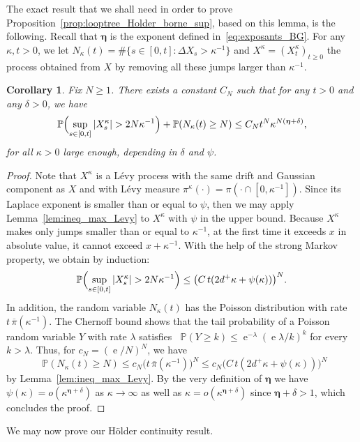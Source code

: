 \documentclass[british, a4paper,11pt]{article}
\numberwithin{equation}{section}
\newtheorem{cor}[thm]{Corollary}
\theoremstyle{definition}
\renewcommand{\P}{\mathop{}\!\mathbb{P}}
\newcommand{\e}{\operatorname{e}}
\newcommand{\bdeta}{\boldsymbol{\eta}}
\begin{document}
The exact result that we shall need in order to prove Proposition~\ref{prop:looptree_Holder_borne_sup}, based on this lemma, is the following.
Recall that $\bdeta$ is the exponent defined in~\eqref{eq:exposants_BG}.
For any $\kappa, t >0$, we let $N_\kappa(t) = \#\{s \in [0,t] \colon \Delta X_s > \kappa^{-1}\}$ and
$X^\kappa = (X^\kappa_t)_{t \ge 0}$ the process obtained from $X$ by removing all these jumps larger than $\kappa^{-1}$. 


\begin{cor}\label{cor:ineq_max_Levy_tronque}
Fix $N \ge 1$. There exists a constant $C_N$ such that for any $t > 0$ and any $\delta>0$, we have
\[\P\Bigl(\sup_{s \in [0,t]} |X^\kappa_{s}| > 2 N \kappa^{-1}\Bigr) + \P(N_\kappa(t) \geq N) 
\leq C_N t^N \kappa^{N(\bdeta+\delta)}
,\]
for all $\kappa > 0$ large enough, depending in $\delta$ and $\psi$.
\end{cor}

\begin{proof}
Note that $X^\kappa$ is a L\'evy process with the same drift and Gaussian component as $X$ and with L\'evy measure $\pi^\kappa(\cdot) = \pi(\cdot \cap [0,\kappa^{-1}])$. 
Since its Laplace exponent is smaller than or equal to $\psi$, then we may apply Lemma~\ref{lem:ineq_max_Levy} to $X^\kappa$ with $\psi$ in the upper bound.
Because $X^\kappa$ makes only jumps smaller than or equal to $\kappa^{-1}$, at the first time it exceeds $x$ in absolute value, it cannot exceed $x+\kappa^{-1}$.
With the help of the strong Markov property, we obtain by induction:
\[\P\Bigl(\sup_{s \in [0,t]} |X^\kappa_{s}| > 2 N \kappa^{-1}\Bigr) 
\leq \bigl(C\, t (2 d^+ \kappa + \psi(\kappa))\bigr)^N.\]
In addition, the random variable $N_\kappa(t)$ has the Poisson distribution with rate $t\, \overline{\pi}(\kappa^{-1})$.
The Chernoff bound shows that the tail probability of a Poisson random variable $Y$ with rate $\lambda$ satisfies $\P(Y \geq k) \leq \e^{-\lambda} (\e \lambda/k)^{k}$ for every $k>\lambda$.
Thus, for $c_N = (\e/N)^{N}$, we have
\[\P(N_\kappa(t) \geq N) 
\leq c_N \bigl(t\, \overline{\pi}(\kappa^{-1})\bigr)^N
\leq c_N \bigl(C\, t (2 d^+ \kappa + \psi(\kappa))\bigr)^N
\]
by Lemma~\ref{lem:ineq_max_Levy}.
By the very definition of $\bdeta$ we have $\psi(\kappa) =o(\kappa^{\bdeta+\delta})$ as $\kappa \to \infty$ as well as $\kappa = o(\kappa^{\bdeta+\delta})$ since $\bdeta+\delta>1$, which concludes the proof.
\end{proof}



We may now prove our H\"older continuity result.
\end{document}

